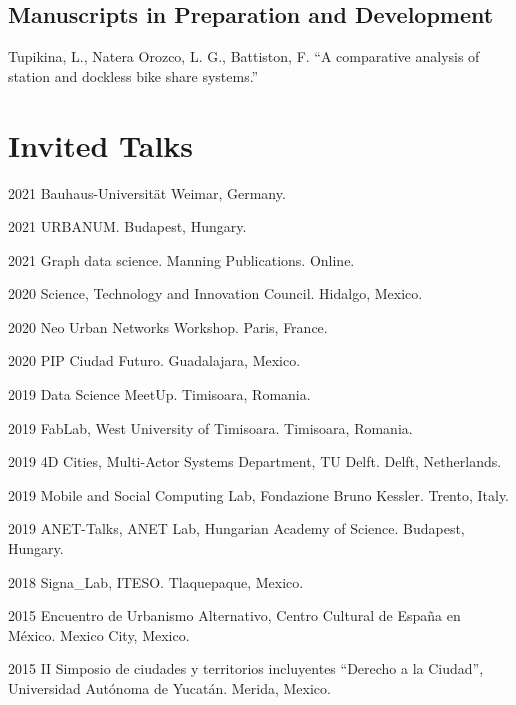 \documentclass{academiccv}
\begin{document}


\subsection*{Manuscripts in Preparation and Development}
\begin{tablist}
	\item[\the\year] \tab Tupikina, L., Natera Orozco, L. G., Battiston, F. \enquote{A comparative analysis of station and dockless bike share systems.} 
\end{tablist}


\section*{Invited Talks}
\begin{tablist}
	\item[2021] \tab Bauhaus-Universität Weimar, Germany.
	\item[2021] \tab URBANUM. Budapest, Hungary.
	\item[2021] \tab Graph data science. Manning Publications. Online.
	\item[2020] \tab Science, Technology and Innovation Council. Hidalgo, Mexico.
	\item[2020] \tab Neo Urban Networks Workshop. Paris, France.
	\item[2020] \tab PIP Ciudad Futuro. Guadalajara, Mexico.
	\item[2019] \tab Data Science MeetUp. Timisoara, Romania.
	\item[2019] \tab FabLab, West University of Timisoara. Timisoara, Romania.
	\item[2019] \tab 4D Cities, Multi-Actor Systems Department, TU Delft. Delft, Netherlands.
	\item[2019] \tab Mobile and Social Computing Lab, Fondazione Bruno Kessler. Trento, Italy.
	\item[2019] \tab ANET-Talks, ANET Lab, Hungarian Academy of Science. Budapest, Hungary.
	\item[2018] \tab Signa\_Lab, ITESO. Tlaquepaque, Mexico.
	\item[2015] \tab Encuentro de Urbanismo Alternativo, Centro Cultural de España en México. Mexico City, Mexico.
	\item[2015] \tab II Simposio de ciudades y territorios incluyentes \enquote{Derecho a la Ciudad}, Universidad Autónoma de Yucatán. Merida, Mexico.
\end{tablist}
\end{document}

